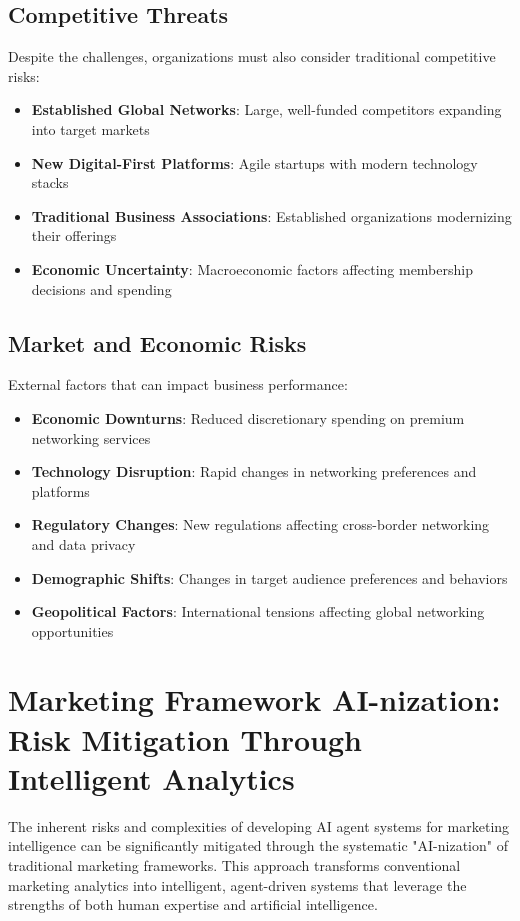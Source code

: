 \subsection{Competitive Threats}

Despite the challenges, organizations must also consider traditional competitive risks:

\begin{itemize}
    \item \textbf{Established Global Networks}: Large, well-funded competitors expanding into target markets
    \item \textbf{New Digital-First Platforms}: Agile startups with modern technology stacks
    \item \textbf{Traditional Business Associations}: Established organizations modernizing their offerings
    \item \textbf{Economic Uncertainty}: Macroeconomic factors affecting membership decisions and spending
\end{itemize}

\subsection{Market and Economic Risks}

External factors that can impact business performance:

\begin{itemize}
    \item \textbf{Economic Downturns}: Reduced discretionary spending on premium networking services
    \item \textbf{Technology Disruption}: Rapid changes in networking preferences and platforms
    \item \textbf{Regulatory Changes}: New regulations affecting cross-border networking and data privacy
    \item \textbf{Demographic Shifts}: Changes in target audience preferences and behaviors
    \item \textbf{Geopolitical Factors}: International tensions affecting global networking opportunities
\end{itemize}

\section{Marketing Framework AI-nization: Risk Mitigation Through Intelligent Analytics}

The inherent risks and complexities of developing AI agent systems for marketing intelligence can be significantly mitigated through the systematic "AI-nization" of traditional marketing frameworks. This approach transforms conventional marketing analytics into intelligent, agent-driven systems that leverage the strengths of both human expertise and artificial intelligence.

